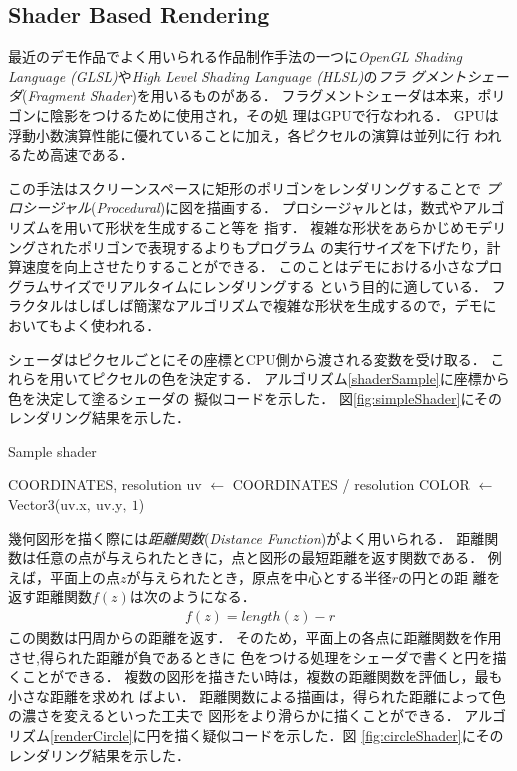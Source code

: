 \subsection{Shader Based Rendering}

最近のデモ作品でよく用いられる作品制作手法の一つに\textit{OpenGL Shading
Language (GLSL)}や\textit{High Level Shading Language (HLSL)}の\emph{フラ
グメントシェーダ}(\textit{Fragment Shader})を用いるものがある．
フラグメントシェーダは本来，ポリゴンに陰影をつけるために使用され，その処
理はGPUで行なわれる．
GPUは浮動小数演算性能に優れていることに加え，各ピクセルの演算は並列に行
われるため高速である．

この手法はスクリーンスペースに矩形のポリゴンをレンダリングすることで
\emph{プロシージャル}(\textit{Procedural})に図を描画する．
プロシージャルとは，数式やアルゴリズムを用いて形状を生成すること等を
指す．
複雑な形状をあらかじめモデリングされたポリゴンで表現するよりもプログラム
の実行サイズを下げたり，計算速度を向上させたりすることができる．
このことはデモにおける小さなプログラムサイズでリアルタイムにレンダリングする
という目的に適している．
フラクタルはしばしば簡潔なアルゴリズムで複雑な形状を生成するので，デモに
おいてもよく使われる．

シェーダはピクセルごとにその座標とCPU側から渡される変数を受け取る．
これらを用いてピクセルの色を決定する．
アルゴリズム\ref{shaderSample}に座標から色を決定して塗るシェーダの
擬似コードを示した．
図\ref{fig:simpleShader}にそのレンダリング結果を示した．
\begin{algorithm}
 \begin{algorithmic}
  \begin{minipage}{0.5\hsize}
   \caption{Sample shader}
   \label{shaderSample}
   \REQUIRE COORDINATES, resolution
   \STATE uv $\leftarrow$ COORDINATES / resolution
   \STATE COLOR $\leftarrow$ Vector3(uv.x$,~$uv.y$,~1$)
  \end{minipage}
 \end{algorithmic}
\end{algorithm}

幾何図形を描く際には\emph{距離関数}(\textit{Distance Function})がよく用いられる．
距離関数は任意の点が与えられたときに，点と図形の最短距離を返す関数である．
例えば，平面上の点$z$が与えられたとき，原点を中心とする半径$r$の円との距
離を返す距離関数$f(z)$は次のようになる．
\begin{align*}
 f(z) =  length(z) - r
\end{align*}
この関数は円周からの距離を返す．
そのため，平面上の各点に距離関数を作用させ,得られた距離が負であるときに
色をつける処理をシェーダで書くと円を描くことができる．
複数の図形を描きたい時は，複数の距離関数を評価し，最も小さな距離を求めれ
ばよい．
距離関数による描画は，得られた距離によって色の濃さを変えるといった工夫で
図形をより滑らかに描くことができる．
アルゴリズム\ref{renderCircle}に円を描く疑似コードを示した．図
\ref{fig:circleShader}にそのレンダリング結果を示した．

